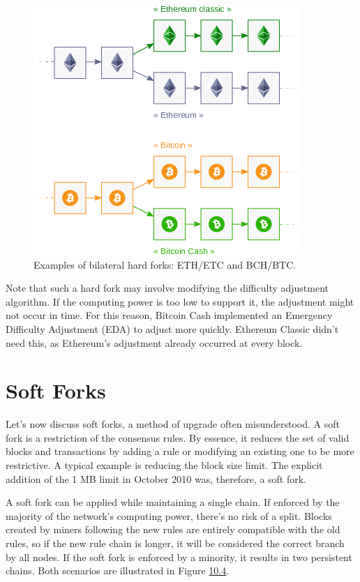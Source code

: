 \documentclass[
  a5paper,
  smalldemyvopaper,10pt,twoside,onecolumn,openright,extrafontsizes,hidelinks]{memoir}
\begin{document}
\begin{figure}

{\centering \includegraphics{chapters/img/hard-forks-eth-etc-bch-btc.png}

}

\caption{Examples of bilateral hard forks: ETH/ETC and BCH/BTC.}

\end{figure}%

Note that such a hard fork may involve modifying the difficulty
adjustment algorithm. If the computing power is too low to support it,
the adjustment might not occur in time. For this reason, Bitcoin Cash
implemented an Emergency Difficulty Adjustment (EDA) to adjust more
quickly. Ethereum Classic didn't need this, as Ethereum's adjustment
already occurred at every block.

\section*{Soft Forks}\label{soft-forks}


Let's now discuss soft forks, a method of upgrade often misunderstood. A
soft fork is a restriction of the consensus rules. By essence, it
reduces the set of valid blocks and transactions by adding a rule or
modifying an existing one to be more restrictive. A typical example is
reducing the block size limit. The explicit addition of the 1 MB limit
in October 2010 was, therefore, a soft fork.

A soft fork can be applied while maintaining a single chain. If enforced
by the majority of the network's computing power, there's no risk of a
split. Blocks created by miners following the new rules are entirely
compatible with the old rules, so if the new rule chain is longer, it
will be considered the correct branch by all nodes. If the soft fork is
enforced by a minority, it results in two persistent chains. Both
scenarios are illustrated in Figure \hyperref[fig:soft-fork]{10.4}.
\end{document}
